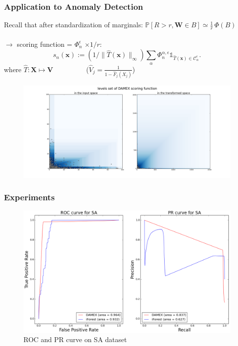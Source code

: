 \documentclass[9pt]{beamer}
\def\mb{\mathbf}
\begin{document}
\begin{frame}
\frametitle{Application to Anomaly Detection}

Recall that after standardization of marginals: 
$\mathbb{P}[R> r  ,\mb W \in B ]  \simeq \frac{1}{r}\,\Phi(B)$ \\~\\
 $\rightarrow$ scoring function = $\Phi_n^\epsilon$  $\times 1/r:$
$$s_n(\mb x):= (1/\|\hat T(\mb x)\|_\infty) \sum_{\alpha }\Phi_n^{\alpha, \epsilon} \mathds{1}_{\hat T(\mb x) \in \mathcal{C}_\alpha^\epsilon}.$$
 where $\hat T: \mb X \mapsto \mb V$ ~~~~~~~~~($\hat V_{j} = \frac{1}{1- \hat F_j (X_{j})} $)

  \begin{figure}
    \centering
    \includegraphics[scale=0.206, trim=2cm 0cm 2cm 1cm]{sourcefigs/plot_damex_level_sets}
  \end{figure}

\end{frame}

\begin{frame}
\frametitle{Experiments}
\begin{figure}[H]
  \centering
  \includegraphics[width = 1. \textwidth]{SA-lb-semi-supervised-average-0001.pdf}
  \caption{ROC and PR curve on SA dataset}
  \label{SA}
\end{figure}
\end{frame}
\end{document}
